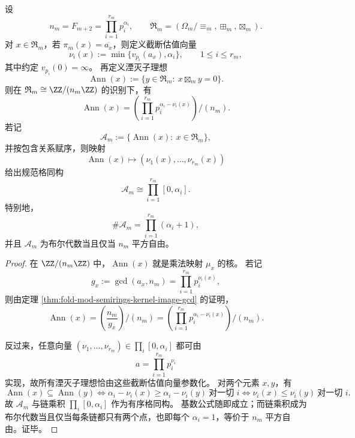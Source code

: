 \begin{theorem}\label{thm:fold-mod-semirings-annihilator-valuation-lattice}
设
\[
n_m=F_{m+2}=\prod_{i=1}^{r_m} p_i^{\alpha_i},
\qquad
\mathfrak R_m=(\Omega_m/\!\equiv_m,\boxplus_m,\boxtimes_m).
\]
对 \(x\in \mathfrak R_m\)，若 \(\pi_m(x)=\overline{a_x}\)，则定义截断估值向量
\[
\nu_i(x):=\min\{v_{p_i}(a_x),\alpha_i\},
\qquad
1\le i\le r_m,
\]
其中约定 \(v_{p_i}(0)=\infty\)。
再定义湮灭子理想
\[
\operatorname{Ann}(x):=\{y\in \mathfrak R_m:\ x\boxtimes_m y=0\}.
\]
则在 \(\mathfrak R_m\cong \ZZ/(n_m\ZZ)\) 的识别下，有
\[
\operatorname{Ann}(x)
=
\left(\prod_{i=1}^{r_m} p_i^{\alpha_i-\nu_i(x)}\right)\Big/\!(n_m).
\]
若记
\[
\mathcal A_m:=\{\operatorname{Ann}(x):\ x\in \mathfrak R_m\},
\]
并按包含关系赋序，则映射
\[
\operatorname{Ann}(x)\longmapsto (\nu_1(x),\dots,\nu_{r_m}(x))
\]
给出规范格同构
\[
\mathcal A_m\cong \prod_{i=1}^{r_m}[0,\alpha_i].
\]
特别地，
\[
\#\mathcal A_m=\prod_{i=1}^{r_m}(\alpha_i+1),
\]
并且 \(\mathcal A_m\) 为布尔代数当且仅当 \(n_m\) 平方自由。
\end{theorem}
\begin{proof}
在 \(\ZZ/(n_m\ZZ)\) 中，\(\operatorname{Ann}(x)\) 就是乘法映射 \(\mu_x\) 的核。
若记
\[
g_x:=\gcd(a_x,n_m)=\prod_{i=1}^{r_m} p_i^{\nu_i(x)},
\]
则由定理 \ref{thm:fold-mod-semirings-kernel-image-gcd} 的证明，
\[
\operatorname{Ann}(x)
=
\left(\frac{n_m}{g_x}\right)\Big/\!(n_m)
=
\left(\prod_{i=1}^{r_m} p_i^{\alpha_i-\nu_i(x)}\right)\Big/\!(n_m).
\]

反过来，任意向量 \((\nu_1,\dots,\nu_{r_m})\in \prod_i [0,\alpha_i]\) 都可由
\[
a=\prod_{i=1}^{r_m} p_i^{\nu_i}
\]
实现，故所有湮灭子理想恰由这些截断估值向量参数化。
对两个元素 \(x,y\)，有
\[
\operatorname{Ann}(x)\subseteq \operatorname{Ann}(y)
\iff
\alpha_i-\nu_i(x)\ge \alpha_i-\nu_i(y)\ \text{对一切 }i
\iff
\nu_i(x)\le \nu_i(y)\ \text{对一切 }i.
\]
故 \(\mathcal A_m\) 与链乘积 \(\prod_i [0,\alpha_i]\) 作为有序格同构。
基数公式随即成立；而链乘积成为布尔代数当且仅当每条链都只有两个点，也即每个 \(\alpha_i=1\)，等价于 \(n_m\) 平方自由。证毕。
\end{proof}

